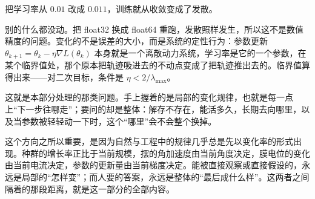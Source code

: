 把学习率从 \(0.01\) 改成 \(0.011\)，训练就从收敛变成了发散。

别的什么都没动。把 float32 换成 float64 重跑，发散照样发生，所以这不是数值精度的问题。变化的不是误差的大小，而是系统的定性行为：参数更新 \(\theta_{k+1} = \theta_k - \eta\nabla L(\theta_k)\) 本身就是一个离散动力系统，学习率是它的一个参数，在某个临界值处，那个原本把轨迹吸进去的不动点变成了把轨迹推出去的。临界值算得出来——对二次目标，条件是 \(\eta < 2/\lambda_{\max}\)。

这就是本部分处理的那类问题。手上握着的是局部的变化规律，也就是每一点上``下一步往哪走''；要问的却是整体：解存不存在，能活多久，长期去向哪里，以及当参数被轻轻动一下时，这个``哪里''会不会整个换掉。

这个方向之所以重要，是因为自然与工程中的规律几乎总是先以变化率的形式出现。种群的增长率正比于当前规模，摆的角加速度由当前角度决定，膜电位的变化由当前电流决定，参数的更新量由当前梯度决定。能被直接观察或直接假设的，永远是局部的``怎样变''；而人要的答案，永远是整体的``最后成什么样''。这两者之间隔着的那段距离，就是这一部分的全部内容。

